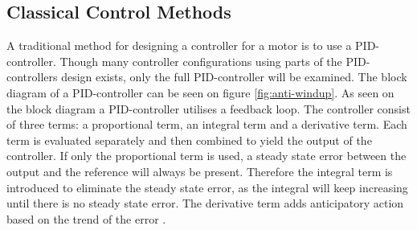 \documentclass[../../main.tex]{subfiles}
\begin{document}
\subsection*{Classical Control Methods}\label{subsec:classic_control}


A traditional method for designing a controller for a motor is to use a PID-controller. Though many controller configurations using parts of the PID-controllers design exists, only the full PID-controller will be examined. The block diagram of a PID-controller can be seen on figure \ref{fig:anti-windup}. As seen on the block diagram
a PID-controller utilises a feedback loop. The controller consist of three terms: a proportional term, an integral term and a derivative term. Each term is evaluated separately and then combined to yield the output of the controller. If only the proportional term is used, a steady state error between the output and the reference will always be present. Therefore the integral term is introduced to eliminate the steady state error, as the integral will keep increasing until there is no steady state error. The derivative term adds anticipatory action based on the trend of the error \cite{PID_Lecture}.





\end{document}
